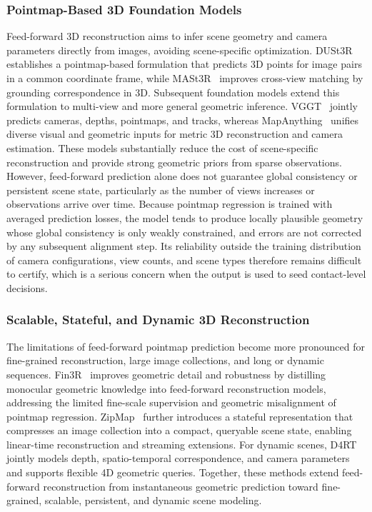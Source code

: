 \documentclass{SCIS2026}
\begin{document}
\subsubsection{Pointmap-Based 3D Foundation Models}

Feed-forward 3D reconstruction aims to infer scene geometry and camera parameters directly from images, avoiding scene-specific optimization. DUSt3R~\cite{wang2024dust3r} establishes a pointmap-based formulation that predicts 3D points for image pairs in a common coordinate frame, while MASt3R~\cite{leroy2024grounding} improves cross-view matching by grounding correspondence in 3D. Subsequent foundation models extend this formulation to multi-view and more general geometric inference. VGGT~\cite{wang2025vggt} jointly predicts cameras, depths, pointmaps, and tracks, whereas MapAnything~\cite{keetha2026mapanything} unifies diverse visual and geometric inputs for metric 3D reconstruction and camera estimation. These models substantially reduce the cost of scene-specific reconstruction and provide strong geometric priors from sparse observations. However, feed-forward prediction alone does not guarantee global consistency or persistent scene state, particularly as the number of views increases or observations arrive over time. Because pointmap regression is trained with averaged prediction losses, the model tends to produce locally plausible geometry whose global consistency is only weakly constrained, and errors are not corrected by any subsequent alignment step. Its reliability outside the training distribution of camera configurations, view counts, and scene types therefore remains difficult to certify, which is a serious concern when the output is used to seed contact-level decisions.

\subsubsection{Scalable, Stateful, and Dynamic 3D Reconstruction}
The limitations of feed-forward pointmap prediction become more pronounced for fine-grained reconstruction, large image collections, and long or dynamic sequences. Fin3R~\cite{ren2025fin3r} improves geometric detail and robustness by distilling monocular geometric knowledge into feed-forward reconstruction models, addressing the limited fine-scale supervision and geometric misalignment of pointmap regression. ZipMap~\cite{jin2026zipmap} further introduces a stateful representation that compresses an image collection into a compact, queryable scene state, enabling linear-time reconstruction and streaming extensions. For dynamic scenes, D4RT~\cite{zhang2026efficiently} jointly models depth, spatio-temporal correspondence, and camera parameters and supports flexible 4D geometric queries. Together, these methods extend feed-forward reconstruction from instantaneous geometric prediction toward fine-grained, scalable, persistent, and dynamic scene modeling.
\end{document}
